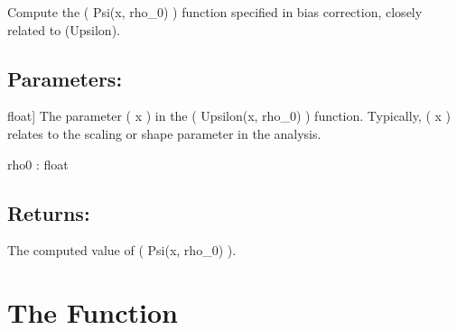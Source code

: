 \documentclass[a4paper,11pt,openany,english]{sphinxmanual}
\begin{document}
\begin{fulllineitems}
\label{\detokenize{api_biascorrection:xtremes.biascorrection.Psi}}
\pysigstartsignatures
{}
\pysigstopsignatures
\sphinxAtStartPar
Compute the ( Psi(x, rho\_0) ) function specified in bias correction, closely related to (Upsilon).


\subsection{Parameters:}
\label{\detokenize{api_biascorrection:id19}}\begin{description}
\sphinxlineitem{x}{[}float{]}
\sphinxAtStartPar
The parameter ( x ) in the ( Upsilon(x,  rho\_0) ) function. Typically, ( x ) relates 
to the scaling or shape parameter in the analysis.

\end{description}

\sphinxAtStartPar
rho0 : float


\subsection{Returns:}
\label{\detokenize{api_biascorrection:id20}}\begin{description}
\sphinxAtStartPar
The computed value of ( Psi(x, rho\_0) ).

\end{description}

\end{fulllineitems}



\section{The  Function}
\label{\detokenize{api_biascorrection:the-a1-asy-function}}
\end{document}
